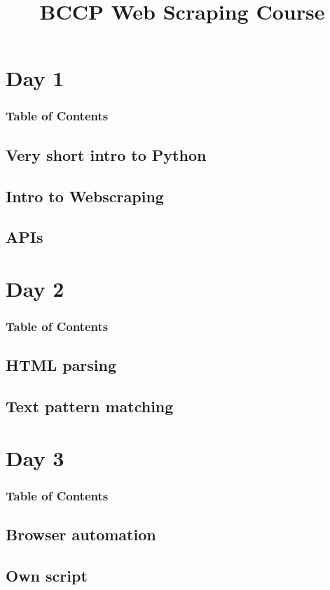 \documentclass[english,aspectratio=169]{beamer}
\begin{document}
\title[Web scraping]{BCCP Web Scraping Course}
\titlegraphic{}

\author[]{}

\date[]{}

\begin{frame}
    \titlepage
\end{frame}

\section{Day 1}
\label{sec:day1}


\begin{frame}
    \frametitle{Table of Contents}
    \tableofcontents[currentsection]
\end{frame}

\subsection{Very short intro to Python}
\label{sec:intropython}


\subsection{Intro to Webscraping}
\label{sec:introwebscraping}



\subsection{APIs}
\label{sec:apis}


\section{Day 2}

\begin{frame}
    \frametitle{Table of Contents}
    \tableofcontents[currentsection]
\end{frame}

\subsection{HTML parsing}



\subsection{Text pattern matching}

\section{Day 3}

\begin{frame}
    \frametitle{Table of Contents}
    \tableofcontents[currentsection]
\end{frame}

\subsection{Browser automation}



\subsection{Own script}
\end{document}
